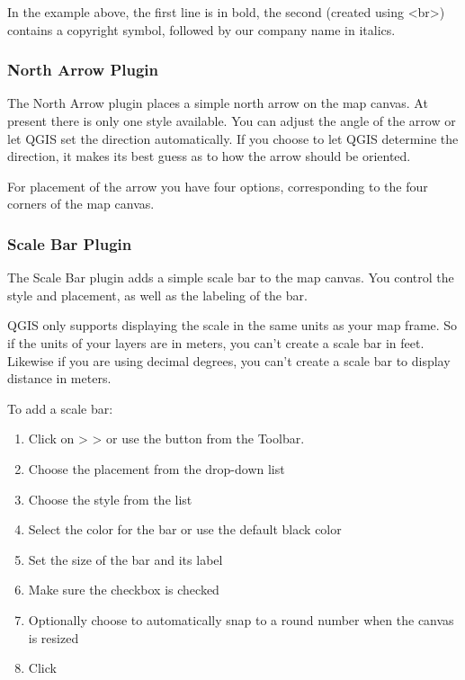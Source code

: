In the example above, the first line is in bold, the second (created using
\textless br\textgreater) contains a copyright symbol, followed by our company name in
italics.

\subsubsection{North Arrow Plugin}

The North Arrow plugin places a simple north arrow on the map canvas. At
present there is only one style available. You can adjust the angle of the
arrow or let QGIS set the direction automatically. If you choose to let
QGIS determine the direction, it makes its best guess as to how the arrow
should be oriented.

For placement of the arrow you have four options, corresponding to the four 
corners of the map canvas.


\subsubsection{Scale Bar Plugin}
The Scale Bar plugin adds a simple scale bar to the map canvas. You
control the style and placement, as well as the labeling of the bar. 

QGIS only supports displaying the scale in the same units as your map frame. So
if the units of your layers are in meters, you can't create a scale bar in
feet. Likewise if you are using decimal degrees, you can't create a scale
bar to display distance in meters.

To add a scale bar:

\begin{enumerate}
\item Click on  >  >  or use the  button from the Toolbar.
\item Choose the placement from the  drop-down list
\item Choose the style from the  list
\item Select the color for the bar  or use the default black color
\item Set the size of the bar and its label 
\item Make sure the  checkbox is checked
\item Optionally choose to automatically snap to a round number when the
  canvas is resized 
\item Click  
\end{enumerate} 

